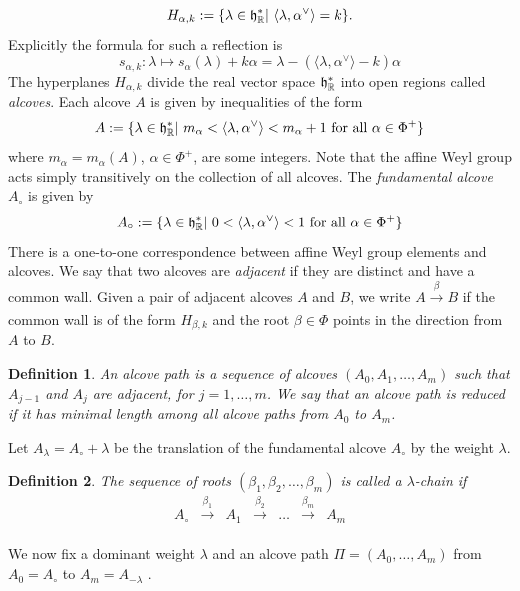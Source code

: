\documentclass[11pt]{amsart}
\newtheorem{definition}{Definition}[section]
\begin{document}
{\[
H_{\alpha,k}:=\{\lambda\in\frak{h}^{*}_{\mathbb{R}}| \text{ } \langle\lambda,\alpha^{\vee}\rangle=k\}.
\]
Explicitly the formula for such a reflection is 
\[
s_{\alpha,k}:\lambda\mapsto s_{\alpha}(\lambda)+k\alpha=\lambda-(\langle\lambda,\alpha^{\vee}\rangle-k)\alpha
\]
The hyperplanes $H_{\alpha,k}$ divide the real vector space $\frak{h}^{*}_{\mathbb{R}}$ into open regions called \emph{alcoves}. Each alcove $A$ is given by inequalities of the form 
\[
A:=\{\lambda \in \frak{h}^{*}_{\mathbb{R}}|\text{ } m_{\alpha}<\langle\lambda,\alpha^{\vee}\rangle<m_{\alpha}+1 \text{ for all } \alpha \in \Phi^{+}\}
\]
where $m_{\alpha}=m_{\alpha}(A)$, $\alpha \in \Phi^{+}$, are some integers. Note that the affine Weyl group acts simply transitively on the collection of all alcoves. The \emph{fundamental alcove} $A_{\circ}$ is given by 
\[
A_{\circ}:=\{\lambda\in\frak{h}^{*}_{\mathbb{R}}|\text{ } 0<\langle\lambda,\alpha^{\vee}\rangle<1\text{ for all } \alpha \in \Phi^{+}\}
\]
There is a one-to-one correspondence between affine Weyl group elements and alcoves.
\newline\indent We say that two alcoves are \emph{adjacent} if they are distinct and have a common wall. Given a pair of adjacent alcoves $A$ and $B$, we write $A\xrightarrow[]{\beta}B$ if the common wall is of the form $H_{\beta,k}$ and the root $\beta\in\Phi$ points in the direction from $A$ to $B$.
\begin{definition} An \emph{alcove path} is a sequence of alcoves $(A_0, A_1, \ldots, A_m)$ such that $A_{j-1}$ and $A_j$ are adjacent, for $j=1,\ldots, m$. We say that an alcove path is \emph{reduced} if it has minimal length among all alcove paths from $A_0$ to $A_m$.
\end{definition}
Let $A_{\lambda}=A_{\circ}+\lambda$ be the translation of the fundamental alcove $A_{\circ}$ by the weight $\lambda$.
\begin{definition}
The sequence of roots $(\beta_1,\beta_2,\ldots,\beta_m)$ is called a \emph{$\lambda$-chain} if 
\[
\begin{matrix}
A_{\circ}&\xrightarrow[]{\beta_1}& A_1&\xrightarrow[]{\beta_2}& \ldots &\xrightarrow[]{\beta_m} & A_m
\end{matrix}
\]
\end{definition}
We now fix a dominant weight $\lambda$ and an alcove path $\Pi=(A_0,\ldots,A_m)$ from $A_0=A_{\circ}$ to $A_m=A_{-\lambda}$ \cite{CL7}.
}
\end{document}
